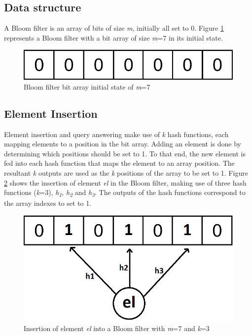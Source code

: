 \subsection*{Data structure}
A Bloom filter is an array of bits of size \textit{m}, initially all set to 0. Figure \ref{fig:initial-bloom-filter} represents a Bloom filter with a bit array of size \textit{m}=7 in its initial state.

\begin{figure}[!htb]
    \begin{center}
      \includegraphics[scale=1.1]{figures/initial-bloom.png}
      \caption[Bloom filter initial state]{Bloom filter bit array initial state of \textit{m}=7}
      \label{fig:initial-bloom-filter}
    \end{center}
\end{figure}

\subsection*{Element Insertion}
Element insertion and query answering make use of \textit{k} hash functions, each mapping elements to a position in the bit array. Adding an element is done by determining which positions should be set to 1. To that end, the new element is fed into each hash function that maps the element to an array position. The resultant \textit{k} outputs are used as the \textit{k} positions of the array to be set to 1. Figure \ref{fig:insertion-bloom-filter} shows the insertion of element \textit{el} in the Bloom filter, making use of three hash functions (\textit{k}=3), \textit{h\textsubscript{1}}, \textit{h\textsubscript{2}} and \textit{h\textsubscript{3}}. The outputs of the hash functions correspond to the array indexes to set to 1.

\begin{figure}[!htb]
    \begin{center}
      \includegraphics[scale=0.4]{figures/insert-bloom.png}
      \caption[Bloom filter insertion]{Insertion of element \textit{el} into a Bloom filter with \textit{m}=7 and \textit{k}=3}
      \label{fig:insertion-bloom-filter}
    \end{center}
\end{figure}


